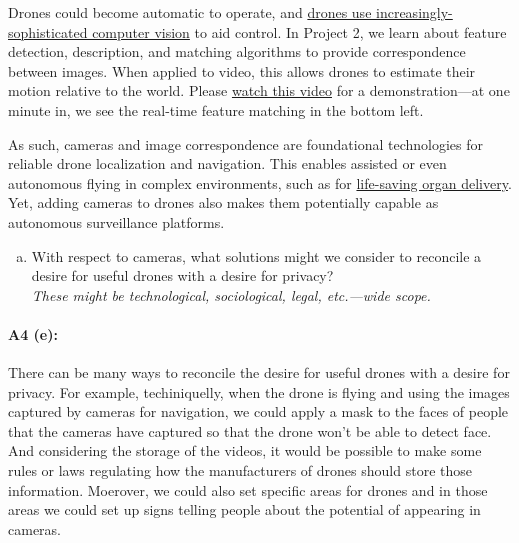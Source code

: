 \newpage
Drones could become automatic to operate, and  \href{https://link.springer.com/article/10.1007/s10846-017-0483-z}{drones use increasingly-sophisticated computer vision} to aid control. In Project 2, we learn about feature detection, description, and matching algorithms to provide correspondence between images. When applied to video, this allows drones to estimate their motion relative to the world. Please \href{https://www.youtube.com/watch?v=jIvJuWdmemE}{watch this video} for a demonstration---at one minute in, we see the real-time feature matching in the bottom left.

As such, cameras and image correspondence are foundational technologies for reliable drone localization and navigation. This enables assisted or even autonomous flying in complex environments, such as for \href{https://www.cnn.com/2019/05/01/health/drone-organ-transplant-bn-trnd/index.html}{life-saving organ delivery}. Yet, adding cameras to drones also makes them potentially capable as autonomous surveillance platforms.

\begin{enumerate}[(e)]
    \item With respect to cameras, what solutions might we consider to reconcile a desire for useful drones with a desire for privacy? \\
    \emph{These might be technological, sociological, legal, etc.---wide scope.}
\end{enumerate}

\paragraph{A4 (e):} There can be many ways to reconcile the desire for useful drones with a desire for privacy. For example, techiniquelly, when the drone is flying and using the images captured by cameras for navigation, we could apply a mask to the faces of people that the cameras have captured so that the drone won't be able to detect face. And considering the storage of the videos, it would be possible to make some rules or laws regulating how the manufacturers of drones should store those information. Moerover, we could also set specific areas for drones and in those areas we could set up signs telling people about the potential of appearing in cameras.








